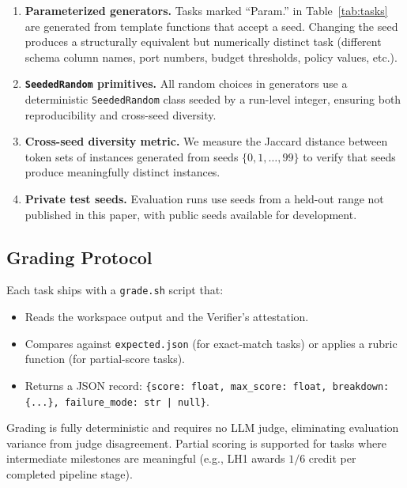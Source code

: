 \documentclass{article}
\newcommand{\sys}[1]{\texttt{#1}}
\begin{document}
\begin{enumerate}
  \item \textbf{Parameterized generators.} Tasks marked ``Param.'' in
        Table~\ref{tab:tasks} are generated from template functions that
        accept a seed. Changing the seed produces a structurally equivalent
        but numerically distinct task (different schema column names, port
        numbers, budget thresholds, policy values, etc.).

  \item \textbf{\sys{SeededRandom} primitives.} All random choices in
        generators use a deterministic \sys{SeededRandom} class seeded by a
        run-level integer, ensuring both reproducibility and cross-seed
        diversity.

  \item \textbf{Cross-seed diversity metric.} We measure the Jaccard
        distance between token sets of instances generated from seeds
        $\{0, 1, \ldots, 99\}$ to verify that seeds produce meaningfully
        distinct instances.

  \item \textbf{Private test seeds.} Evaluation runs use seeds from a held-out
        range not published in this paper, with public seeds available for
        development.
\end{enumerate}

\subsection{Grading Protocol}
\label{sec:design:grading}

Each task ships with a \sys{grade.sh} script that:
\begin{itemize}
  \item Reads the workspace output and the Verifier's attestation.
  \item Compares against \sys{expected.json} (for exact-match tasks) or
        applies a rubric function (for partial-score tasks).
  \item Returns a JSON record: \sys{\{score: float, max\_score: float,
        breakdown: \{...\}, failure\_mode: str | null\}}.
\end{itemize}

Grading is fully deterministic and requires no LLM judge, eliminating
evaluation variance from judge disagreement. Partial scoring is supported
for tasks where intermediate milestones are meaningful (e.g., LH1 awards
$1/6$ credit per completed pipeline stage).
\end{document}
